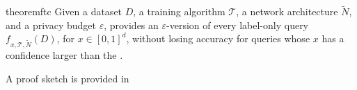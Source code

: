 \begin{comment}
\begin{theorem}
Given a dataset $D$, a training algorithm $\mathcal{T}$, a network architecture $\widetilde{N}$, and a privacy budget $\varepsilon$,
  for every $x\in [0,1]^d$, \reptool provides an $\varepsilon$-\propi version of the query $f_{x,\mathcal{T},\widetilde{N}}(D)$. 
\end{theorem}
\end{comment}

\begin{restatable}[]{theorem}{ftc}
Given a dataset $D$, a training algorithm $\mathcal{T}$, a network architecture $\widetilde{N}$, and a privacy budget $\varepsilon$,
\reptool provides an $\varepsilon$-\propi version of every label-only query $f_{x,\mathcal{T},\widetilde{N}}(D)$, for $x \in [0,1]^d$, without losing accuracy for queries whose $x$ has a confidence larger than the \propa.
\end{restatable} 

 A proof sketch is provided in 

\begin{comment}
\paragraph{Guarantees}
Given a noise function that guarantees $(\varepsilon,\delta)$-DP, our repair is $(\varepsilon,\delta)$-DP. This follows because 
our repair partitions the input space based on the relation of their classification confidence in the predicted class to the respective \propa.
By definition, querying the output of any input whose confidence in the predicted class is above the respective \propa is $(0,0)$-DP. 
By the noise function's guarantee, querying the output of any input whose confidence in the predicted class is at most the respective \propa is $(\varepsilon,\delta)$-DP.
By parallel composition~\cite{McSherry10}, the DP guarantee of our repair is determined by the worst DP bound, thus it guarantees $(\varepsilon,\delta)$-DP.
\end{comment}
